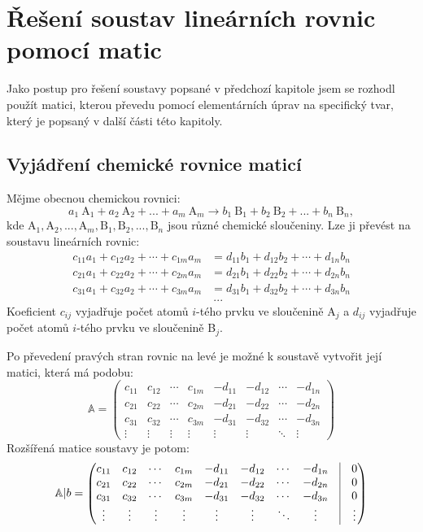 \documentclass[12pt,a4paper]{report}
\newcommand{\n}[1]{\mbox{#1}}
\newcommand{\sipka}{\rightarrow}
\begin{document}
\chapter{Řešení soustav lineárních rovnic pomocí matic}
Jako postup pro řešení soustavy popsané v předchozí kapitole jsem se rozhodl použít matici, kterou převedu pomocí elementárních úprav na specifický tvar, který je popsaný v další části této kapitoly.

\section{Vyjádření chemické rovnice maticí}
Mějme obecnou chemickou rovnici:
$$a_1~\n{A}_1 + a_2~\n{A}_2 + ... + a_m~\n{A}_m \sipka b_1~\n{B}_1 + b_2~\n{B}_2 + ...+ b_n~\n{B}_n,$$
kde $\n{A}_1, \n{A}_2, ..., \n{A}_m, \n{B}_1, \n{B}_2, ..., \n{B}_n$ jsou různé chemické sloučeniny. Lze ji převést na soustavu lineárních rovnic:
\begin{align*}
	c_{11}a_{1} + c_{12}a_{2} + \cdots + c_{1m}a_{m} &= d_{11}b_{1} + d_{12}b_{2} + \cdots + d_{1n}b_{n}\\
	c_{21}a_{1} + c_{22}a_{2} + \cdots + c_{2m}a_{m} &= d_{21}b_{1} + d_{22}b_{2} + \cdots + d_{2n}b_{n}\\
	c_{31}a_{1} + c_{32}a_{2} + \cdots + c_{3m}a_{m} &= d_{31}b_{1} + d_{32}b_{2} + \cdots + d_{3n}b_{n}\\
	&~...
\end{align*}
Koeficient $ c_{ij} $ vyjadřuje počet atomů $ i $-tého prvku ve sloučenině A$ _j $ a $ d_{ij} $ vyjadřuje počet atomů $ i $-tého prvku ve sloučenině B$ _j $.

Po převedení pravých stran rovnic na levé je možné k soustavě vytvořit její matici, která má podobu:
$$\mathbb{A} = \begin{pmatrix}
	c_{11} & c_{12} & \cdots & c_{1m} & -d_{11} & -d_{12} & \cdots & -d_{1n}\\
	c_{21} & c_{22} & \cdots & c_{2m} & -d_{21} & -d_{22} & \cdots & -d_{2n}\\
	c_{31} & c_{32} & \cdots & c_{3m} & -d_{31} & -d_{32} & \cdots & -d_{3n}\\
    \vdots & \vdots & \vdots & \vdots & \vdots  & \vdots  & \ddots & \vdots 
\end{pmatrix}$$
Rozšířená matice soustavy je potom:
$$\mathbb{A}|b = \begin{pmatrix}
	c_{11} & c_{12} & \cdots & c_{1m} & -d_{11} & -d_{12} & \cdots & -d_{1n} & \vline & 0\\
	c_{21} & c_{22} & \cdots & c_{2m} & -d_{21} & -d_{22} & \cdots & -d_{2n} & \vline & 0\\
	c_{31} & c_{32} & \cdots & c_{3m} & -d_{31} & -d_{32} & \cdots & -d_{3n} & \vline & 0\\
    \vdots & \vdots & \vdots & \vdots & \vdots  & \vdots  & \ddots &  \vdots & \vline & \vdots
\end{pmatrix}$$
\end{document}
